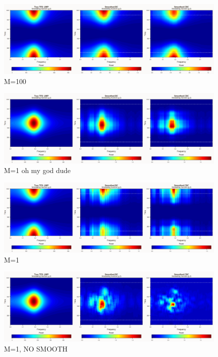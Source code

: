 \documentclass{article}
\begin{document}
\begin{figure}
    \centering
    \includegraphics[width=\linewidth]{Fig/smoothgrams_UMP_B200_rev_letterbox.png}
    \caption{M=100}
    \label{fig:enter-label}
\end{figure}

\begin{figure}
    \centering
    \includegraphics[width=\linewidth]{Fig/smoothgrams_UMP_B200_single.png}
    \caption{M=1 oh my god dude}
    \label{fig:enter-label}
\end{figure}

\begin{figure}
    \centering
    \includegraphics[width=\linewidth]{Fig/smoothgrams_UMP_B200_rev_single.png}
    \caption{M=1}
    \label{fig:enter-label}
\end{figure}

\begin{figure}
    \centering
    \includegraphics[width=\linewidth]{Fig/smoothgrams_UMP_B200_raw.png}
    \caption{M=1, NO SMOOTH}
    \label{fig:enter-label}
\end{figure}
\end{document}

